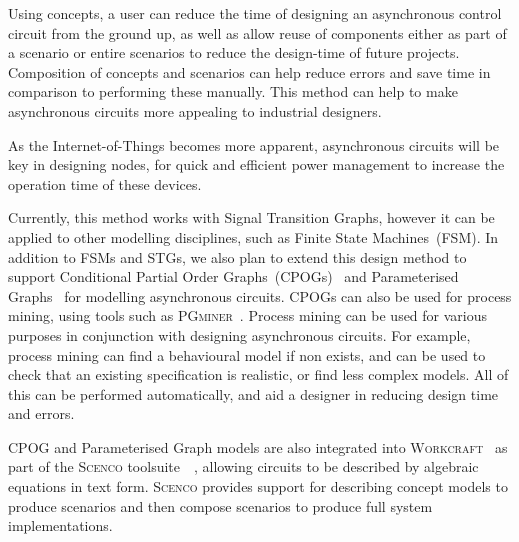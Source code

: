 \documentclass[british,compsoc]{IEEEtran}
\newcommand{\noun}[1]{\textsc{#1}}
\begin{document}
Using concepts, a user can reduce the time of designing an asynchronous
control circuit from the ground up, as well as allow reuse of components
either as part of a scenario or entire scenarios to reduce the design-time
of future projects. Composition of concepts and scenarios can help
reduce errors and save time in comparison to performing these manually.
This method can help to make asynchronous circuits more appealing
to industrial designers.

As the Internet-of-Things becomes more apparent, asynchronous circuits
will be key in designing nodes, for quick and efficient power management
to increase the operation time of these devices.

Currently, this method works with Signal Transition Graphs, however
it can be applied to other modelling disciplines, such as Finite State
Machines~(FSM). In addition to FSMs and STGs, we also plan to extend
this design method to support Conditional Partial Order
Graphs~(CPOGs)~\cite{CPOG1} and Parameterised
Graphs~\cite{mokhov2014algebra} for modelling asynchronous circuits.
CPOGs can also be used for process mining, using tools such as
\noun{PGminer}~\cite{mokhov_2016_mining}\cite{pgminer}. Process mining
can be used for various purposes in conjunction with designing
asynchronous circuits. For example, process mining can find a
behavioural model if non exists, and can be
used to check that an existing specification is realistic, or find less
complex models. All of this can be performed automatically, and aid a
designer in reducing design time and errors.



CPOG and Parameterised Graph models are also integrated into
\noun{Workcraft}~\cite{Workcraft_website} as part of the \noun{Scenco} toolsuite~\cite{2015_workcraft_scenco}~\cite{Scenco_paper},
allowing circuits to be described by algebraic equations in text
form. \noun{Scenco} provides support for describing concept models
to produce scenarios and then compose scenarios to produce full system
implementations.

\end{document}
